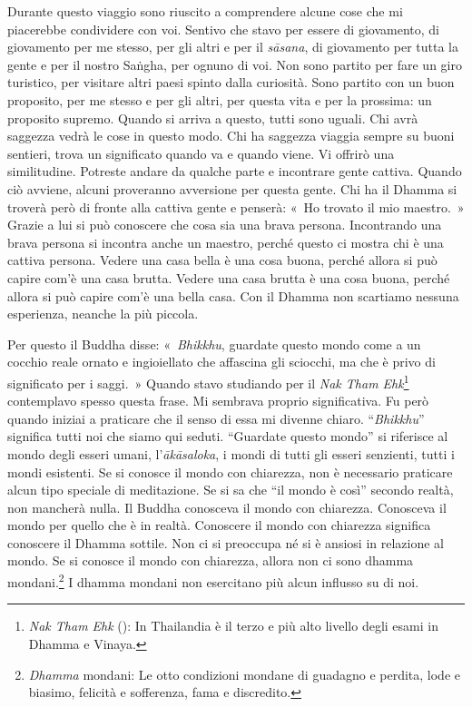 Durante questo viaggio sono riuscito a comprendere alcune cose che mi
piacerebbe condividere con voi. Sentivo che stavo per essere di
giovamento, di giovamento per me stesso, per gli altri e per il
\emph{sāsana}, di giovamento per tutta la gente e per il nostro Saṅgha,
per ognuno di voi. Non sono partito per fare un giro turistico, per
visitare altri paesi spinto dalla curiosità. Sono partito con un buon
proposito, per me stesso e per gli altri, per questa vita e per la
prossima: un proposito supremo. Quando si arriva a questo, tutti sono
uguali. Chi avrà saggezza vedrà le cose in questo modo. Chi ha saggezza
viaggia sempre su buoni sentieri, trova un significato quando va e
quando viene. Vi offrirò una similitudine. Potreste andare da qualche
parte e incontrare gente cattiva. Quando ciò avviene, alcuni proveranno
avversione per questa gente. Chi ha il Dhamma si troverà però di fronte
alla cattiva gente e penserà: «~Ho trovato il mio maestro.~» Grazie a
lui si può conoscere che cosa sia una brava persona. Incontrando una
brava persona si incontra anche un maestro, perché questo ci mostra chi
è una cattiva persona. Vedere una casa bella è una cosa buona, perché
allora si può capire com'è una casa brutta. Vedere una casa brutta è una
cosa buona, perché allora si può capire com'è una bella casa. Con il
Dhamma non scartiamo nessuna esperienza, neanche la più piccola.

Per questo il Buddha disse: «~\emph{Bhikkhu}, guardate questo mondo come
a un cocchio reale ornato e ingioiellato che affascina gli sciocchi, ma
che è privo di significato per i saggi.~» Quando stavo studiando per il
\emph{Nak Tham Ehk}\footnote{\emph{Nak Tham Ehk} (): In
  Thailandia è il terzo e più alto livello degli esami in Dhamma e
  Vinaya.} contemplavo spesso questa frase. Mi sembrava proprio
significativa. Fu però quando iniziai a praticare che il senso di essa
mi divenne chiaro. ``\emph{Bhikkhu}'' significa tutti noi che siamo qui
seduti. ``Guardate questo mondo'' si riferisce al mondo degli esseri
umani, l'\emph{ākāsaloka}, i mondi di tutti gli esseri senzienti, tutti
i mondi esistenti. Se si conosce il mondo con chiarezza, non è
necessario praticare alcun tipo speciale di meditazione. Se si sa che
``il mondo è così'' secondo realtà, non mancherà nulla. Il Buddha
conosceva il mondo con chiarezza. Conosceva il mondo per quello che è in
realtà. Conoscere il mondo con chiarezza significa conoscere il Dhamma
sottile. Non ci si preoccupa né si è ansiosi in relazione al mondo. Se
si conosce il mondo con chiarezza, allora non ci sono dhamma
mondani.\footnote{\emph{Dhamma} mondani: Le otto condizioni mondane di
  guadagno e perdita, lode e biasimo, felicità e sofferenza, fama e
  discredito.} I dhamma mondani non esercitano più alcun influsso
su di noi.

